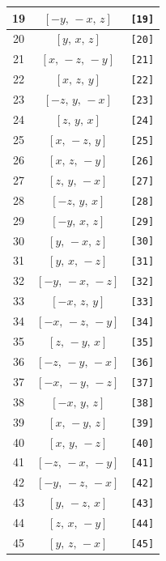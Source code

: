 \documentclass[fleqn,8pt]{jsarticle}
\begin{document}
\begin{longtable}{ccc}
19 & $\left[ - y,\, - x,\, z \right]$ & {\tt [19]} \\ \hline
20 & $\left[ y,\, x,\, z \right]$ & {\tt [20]} \\ \hline
21 & $\left[ x,\, - z,\, - y \right]$ & {\tt [21]} \\ \hline
22 & $\left[ x,\, z,\, y \right]$ & {\tt [22]} \\ \hline
23 & $\left[ - z,\, y,\, - x \right]$ & {\tt [23]} \\ \hline
24 & $\left[ z,\, y,\, x \right]$ & {\tt [24]} \\ \hline
25 & $\left[ x,\, - z,\, y \right]$ & {\tt [25]} \\ \hline
26 & $\left[ x,\, z,\, - y \right]$ & {\tt [26]} \\ \hline
27 & $\left[ z,\, y,\, - x \right]$ & {\tt [27]} \\ \hline
28 & $\left[ - z,\, y,\, x \right]$ & {\tt [28]} \\ \hline
29 & $\left[ - y,\, x,\, z \right]$ & {\tt [29]} \\ \hline
30 & $\left[ y,\, - x,\, z \right]$ & {\tt [30]} \\ \hline
31 & $\left[ y,\, x,\, - z \right]$ & {\tt [31]} \\ \hline
32 & $\left[ - y,\, - x,\, - z \right]$ & {\tt [32]} \\ \hline
33 & $\left[ - x,\, z,\, y \right]$ & {\tt [33]} \\ \hline
34 & $\left[ - x,\, - z,\, - y \right]$ & {\tt [34]} \\ \hline
35 & $\left[ z,\, - y,\, x \right]$ & {\tt [35]} \\ \hline
36 & $\left[ - z,\, - y,\, - x \right]$ & {\tt [36]} \\ \hline
37 & $\left[ - x,\, - y,\, - z \right]$ & {\tt [37]} \\ \hline
38 & $\left[ - x,\, y,\, z \right]$ & {\tt [38]} \\ \hline
39 & $\left[ x,\, - y,\, z \right]$ & {\tt [39]} \\ \hline
40 & $\left[ x,\, y,\, - z \right]$ & {\tt [40]} \\ \hline
41 & $\left[ - z,\, - x,\, - y \right]$ & {\tt [41]} \\ \hline
42 & $\left[ - y,\, - z,\, - x \right]$ & {\tt [42]} \\ \hline
43 & $\left[ y,\, - z,\, x \right]$ & {\tt [43]} \\ \hline
44 & $\left[ z,\, x,\, - y \right]$ & {\tt [44]} \\ \hline
45 & $\left[ y,\, z,\, - x \right]$ & {\tt [45]} \\ \hline

\end{longtable}
\end{document}

